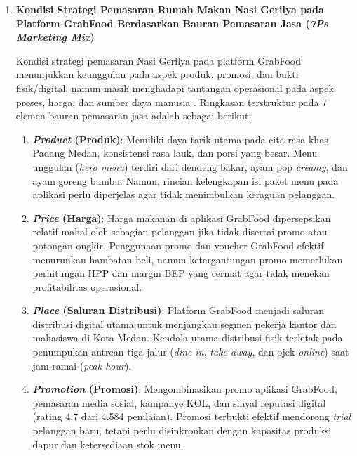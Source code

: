 \begin{enumerate}
    \item \textbf{Kondisi Strategi Pemasaran Rumah Makan Nasi Gerilya pada Platform GrabFood Berdasarkan Bauran Pemasaran Jasa (\textit{7Ps Marketing Mix})}
    
    Kondisi strategi pemasaran Nasi Gerilya pada platform GrabFood menunjukkan keunggulan pada aspek produk, promosi, dan bukti fisik/digital, namun masih menghadapi tantangan operasional pada aspek proses, harga, dan sumber daya manusia \parencite{kotler2023principlesmarketing,wirtz2024servicesmarketing}. Ringkasan terstruktur pada 7 elemen bauran pemasaran jasa adalah sebagai berikut:
    
    \begin{enumerate}[label=\alph*.]
        \item \textbf{\textit{Product} (Produk)}: Memiliki daya tarik utama pada cita rasa khas Padang Medan, konsistensi rasa lauk, dan porsi yang besar. Menu unggulan (\textit{hero menu}) terdiri dari dendeng bakar, ayam pop \textit{creamy}, dan ayam goreng bumbu. Namun, rincian kelengkapan isi paket menu pada aplikasi perlu diperjelas agar tidak menimbulkan keraguan pelanggan.
        
        \item \textbf{\textit{Price} (Harga)}: Harga makanan di aplikasi GrabFood dipersepsikan relatif mahal oleh sebagian pelanggan jika tidak disertai promo atau potongan ongkir. Penggunaan promo dan voucher GrabFood efektif menurunkan hambatan beli, namun ketergantungan promo memerlukan perhitungan HPP dan margin BEP yang cermat agar tidak menekan profitabilitas operasional.
        
        \item \textbf{\textit{Place} (Saluran Distribusi)}: Platform GrabFood menjadi saluran distribusi digital utama untuk menjangkau segmen pekerja kantor dan mahasiswa di Kota Medan. Kendala utama distribusi fisik terletak pada penumpukan antrean tiga jalur (\textit{dine in}, \textit{take away}, dan ojek \textit{online}) saat jam ramai (\textit{peak hour}).
        
        \item \textbf{\textit{Promotion} (Promosi)}: Mengombinasikan promo aplikasi GrabFood, pemasaran media sosial, kampanye KOL, dan sinyal reputasi digital (rating 4,7 dari 4.584 penilaian). Promosi terbukti efektif mendorong \textit{trial} pelanggan baru, tetapi perlu disinkronkan dengan kapasitas produksi dapur dan ketersediaan stok menu.
        

\end{enumerate}
\end{enumerate}
